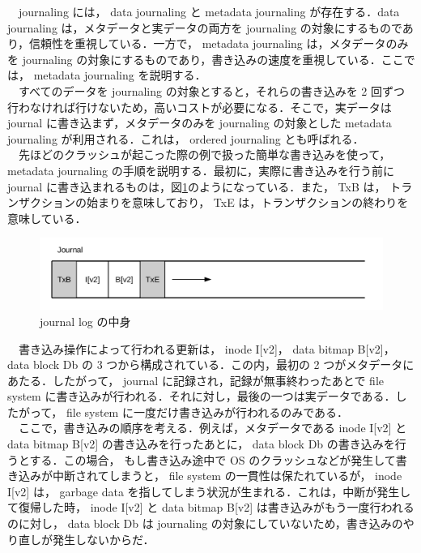 \documentclass[graduation-thesis]{jsarticle}
\begin{document}
　journaling には， data journaling と metadata journaling が存在する．data journaling は，メタデータと実データの両方を journaling の対象にするものであり，信頼性を重視している．一方で， metadata journaling は，メタデータのみを journaling の対象にするものであり，書き込みの速度を重視している．ここでは， metadata journaling を説明する．\\
　すべてのデータを journaling の対象とすると，それらの書き込みを 2 回ずつ行わなければ行けないため，高いコストが必要になる．そこで，実データは journal に書き込まず，メタデータのみを journaling の対象とした metadata journaling が利用される．これは， ordered journaling とも呼ばれる．\\
　先ほどのクラッシュが起こった際の例で扱った簡単な書き込みを使って， metadata journaling の手順を説明する．最初に，実際に書き込みを行う前に journal に書き込まれるものは，図\ref{fig:metaj}のようになっている．また， TxB は， トランザクションの始まりを意味しており， TxE は，トランザクションの終わりを意味している．
\begin{figure}[H]
	\begin{center}
		\includegraphics[width=15.0cm,clip]{images/journalLog.pdf}
		\caption{journal log の中身}
		\label{fig:metaj}
	\end{center}
\end{figure}
　書き込み操作によって行われる更新は， inode I[v2]， data bitmap B[v2]， data block Db の 3 つから構成されている．この内，最初の 2 つがメタデータにあたる．したがって， journal に記録され，記録が無事終わったあとで file system に書き込みが行われる．それに対し，最後の一つは実データである．したがって， file system に一度だけ書き込みが行われるのみである．\\
　ここで，書き込みの順序を考える．例えば，メタデータである inode I[v2] と data bitmap B[v2] の書き込みを行ったあとに， data block Db の書き込みを行うとする．この場合， もし書き込み途中で OS のクラッシュなどが発生して書き込みが中断されてしまうと， file system の一貫性は保たれているが， inode I[v2] は， garbage data を指してしまう状況が生まれる．これは，中断が発生して復帰した時， inode I[v2] と data bitmap B[v2] は書き込みがもう一度行われるのに対し， data block Db は journaling の対象にしていないため，書き込みのやり直しが発生しないからだ．\\
\end{document}
